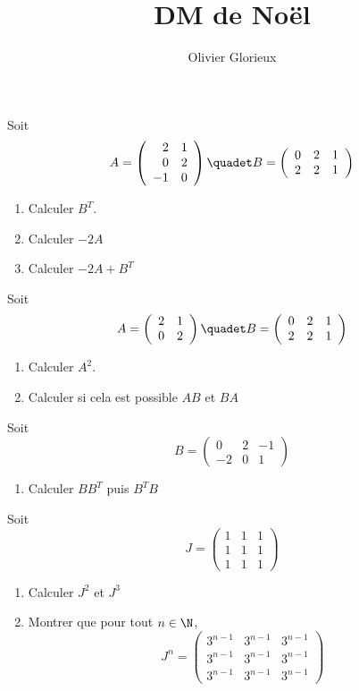 \documentclass[a4paper, 11pt,reqno]{article}
\author{Olivier Glorieux}
\begin{document}
\title{DM de Noël 
}

\begin{exercice}
Soit $$A=\left(\begin{array}{rr} 2&1\\0&2\\-1&0 \end{array}\right) \quadet B=\left(\begin{array}{rrr} 0&2&1\\2&2&1 \end{array}\right)$$
\begin{enumerate}
\item Calculer $B^T$.
\item Calculer $-2A$
\item Calculer $-2A+B^T$
\end{enumerate}
\end{exercice}


\begin{exercice}
Soit $$A=\left(\begin{array}{rr} 2&1\\0&2 \end{array}\right) \quadet B=\left(\begin{array}{rrr} 0&2&1\\2&2&1 \end{array}\right)$$
\begin{enumerate}
\item Calculer $A^2$.
\item Calculer si cela est possible $AB$ et $BA$
\end{enumerate}
\end{exercice}




\begin{exercice}
Soit $$B=\left(\begin{array}{rrr} 0&2&-1\\-2&0&1 \end{array}\right)$$
\begin{enumerate}
\item Calculer $BB^T$ puis $B^T B$
\end{enumerate}
\end{exercice}


\begin{exercice}
Soit $$J=\left(\begin{array}{rrr} 1&1&1\\1&1&1 \\1&1&1 \end{array}\right)$$
\begin{enumerate}
\item Calculer $J^2$ et $J^3$
\item Montrer que pour tout $n\in \N$, $$J^n =\left(\begin{array}{rrr} 3^{n-1}&3^{n-1}&3^{n-1}\\3^{n-1}&3^{n-1}&3^{n-1} \\3^{n-1}&3^{n-1}&3^{n-1} \end{array}\right)$$
\end{enumerate}
\end{exercice}
\end{document}
